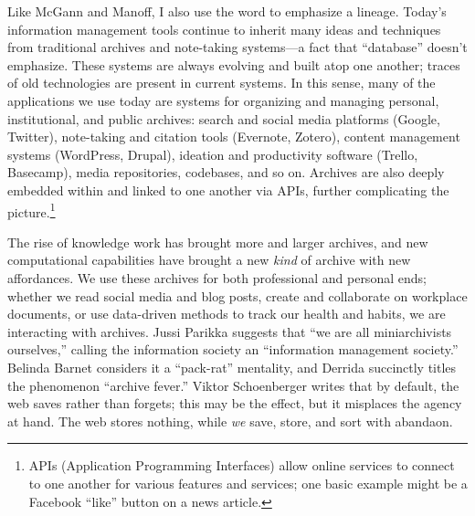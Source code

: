 Like McGann and Manoff, I also use the word to emphasize a lineage. Today's information management tools continue to inherit many ideas and techniques from traditional archives and note-taking systems---a fact that ``database'' doesn't emphasize. These systems are always evolving and built atop one another; traces of old technologies are present in current systems. In this sense, many of the applications we use today are systems for organizing and managing personal, institutional, and public archives: search and social media platforms (Google, Twitter), note-taking and citation tools (Evernote, Zotero), content management systems (WordPress, Drupal), ideation and productivity software (Trello, Basecamp), media repositories, codebases, and so on. Archives are also deeply embedded within and linked to one another via APIs, further complicating the picture.\footnote{APIs (Application Programming Interfaces) allow online services to connect to one another for various features and services; one basic example might be a Facebook ``like'' button on a news article.}

The rise of knowledge work has brought more and larger archives, and new computational capabilities have brought a new \emph{kind} of archive with new affordances. We use these archives for both professional and personal ends; whether we read social media and blog posts, create and collaborate on workplace documents, or use data-driven methods to track our health and habits, we are interacting with archives. Jussi Parikka suggests that ``we are all miniarchivists ourselves,'' calling the information society an ``information management society.''\autocite[2]{ernst_archival_2012} Belinda Barnet considers it a ``pack-rat'' mentality, and Derrida succinctly titles the phenomenon ``archive fever.'' Viktor Schoenberger writes that by default, the web saves rather than forgets; this may be the effect, but it misplaces the agency at hand.\autocite{schoenberger_useful_2007} The web stores nothing, while \emph{we} save, store, and sort with abandaon.



